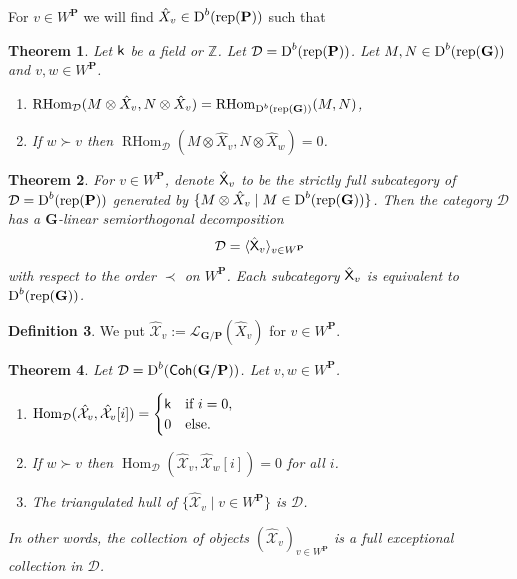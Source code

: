 \documentclass[sn-mathphys-num]{sn-jnl}%
\newcommand{\tX}{{\mathcal X}}
\newcommand{\Ll}{\mathcal L}
\newcommand{\D}{\mathcal D}
\newcommand{\rep}{{\mathrm{rep}}}
\newcommand*{\Dd}{\mathop{\mathrm D\kern0pt}\nolimits}
\newcommand*{\Hom}{\mathop{\mathrm {Hom}}\nolimits}
\newcommand*{\RHom}{\mathop{\mathrm {RHom}}\nolimits}
\newcommand*{\Coh}{\mathop{\sf {Coh}}\nolimits}
\newcommand{\sk}{{\sf k}}
\newcommand{\Z}{{\mathbb Z}}
\newcommand{\bg}{\mathbf G}
\newcommand{\bp}{\mathbf P}
\def\text#1{\mbox{#1}}
\newtheorem{theorem}{Theorem}[section]
\theoremstyle{definition}
\newtheorem{definition}[theorem]{Definition}%
\begin{document}
For $v\in W^\bp$ we will find ${\hat X}_v\in \Dd^b (\rep ( \bp ))$  such that
 
\begin{theorem}Let $\sk$ be a field or $\Z$.
\label{th:Z-X^P_p-G-exceptional-coll}
Let $\D=\Dd^b (\rep ( \bp ))$.
Let $M, N\in \Dd^b(\rep(\bg))$ and $v,w\in W^\bp$.
\begin{enumerate}
\item $\RHom_\D(M\otimes {\hat X}_v,N\otimes {\hat X}_v)=\RHom_ {\Dd^b(\rep(\bg))} (M,N) $,
\item If $w\succ  v$ then $\RHom_\D(M\otimes {\hat X}_v,N\otimes {\hat X}_w)=0$.
\end{enumerate}
\end{theorem}

\begin{theorem}\label{th:Psemi-orthogonal}
For $v\in W^\bp$, denote ${\hat{\sf X}} _v$ to be the 
strictly full subcategory of
$\D=\Dd ^b(\rep(\bp))$ generated by $\{M\otimes {\hat X}_v \mid M\in \Dd ^b(\rep( \bg))\}$.
Then the category $\D$ has a $ \bg$-linear semiorthogonal decomposition 
\begin{equation}
\D= \langle {\hat{\sf X}} _v\rangle _{v\in W^\bp}
\end{equation}
with respect to the order $\prec$ on  $W^\bp$. Each subcategory ${\hat{\sf X}} _v$ is equivalent to $\Dd ^b(\rep( \bg))$.
\end{theorem}

\begin{definition}
 We put $\hat\tX_v:=\Ll_{\bg/\bp}({\hat X}_v)$ for $v\in W^\bp$. 
\end{definition}


\begin{theorem}\label{th:Pcoh-semi-orthogonal}Let $\D=\Dd^b (\Coh( \bg / \bp))$.
Let $v,w\in W^\bp$.\\
\begin{enumerate}
\item $\Hom_\D(\hat\tX_v,\hat\tX_v[i])=\begin{cases}\sk &\text{if $i=0$},\\
0&\text{else.}\end{cases}$\\



\item If $w\succ  v$ then $\Hom_\D(\hat\tX_v,\hat\tX_w[i])=0$ for all $i$.\\
\item The triangulated hull of $\{\hat\tX_v\mid v \in W^\bp\}$ is $\D$.
\end{enumerate}
In other words, the collection of objects $(\hat\tX_v)_{v \in W^\bp}$ is a full exceptional collection in $ \D$.
\end{theorem}
\end{document}
